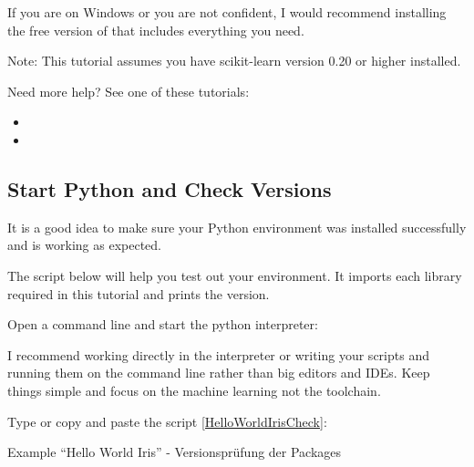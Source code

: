 If you are on Windows or you are not confident, I would recommend installing the free version of  that includes everything you need.

\medskip

Note: This tutorial assumes you have scikit-learn version 0.20 or higher installed.

\medskip

Need more help? See one of these tutorials:


\begin{itemize}
  \item {}
  \item {}
\end{itemize}

\subsection{Start Python and Check Versions}

It is a good idea to make sure your Python environment was installed successfully and is working as expected.

The script below will help you test out your environment. It imports each library required in this tutorial and prints the version.

Open a command line and start the python interpreter:

\medskip

\medskip

I recommend working directly in the interpreter or writing your scripts and running them on the command line rather than big editors and IDEs. Keep things simple and focus on the machine learning not the toolchain.

Type or copy and paste the  script \ref{HelloWorldIrisCheck}:


\begin{code}
      
    
    \caption{Example ``Hello World Iris'' - Versionsprüfung der Packages}\label{HelloWorldIrisCheck}
\end{code}      


